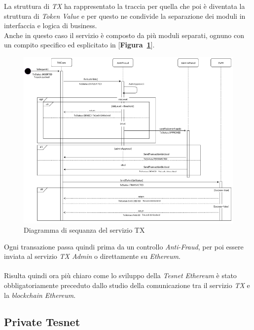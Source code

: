 \documentclass[11pt]{thesistemp}
\begin{document}
La struttura di \textit{TX} ha rappresentato la traccia per quella che poi è diventata la struttura di \textit{Token Value} e per questo ne condivide la separazione dei moduli in interfaccia e logica di business.\\
Anche in questo caso il servizio è composto da più moduli separati, ognuno con un compito specifico ed esplicitato in [\textbf{Figura~\ref{fig:tx-seq-diag}}].\\
\begin{figure}[h]
    \centering
    \includegraphics[scale=0.55]{tx-seq-diag.png}
        \caption{Diagramma di sequanza del servizio TX}
    \label{fig:tx-seq-diag}
\end{figure}
\linebreak
Ogni transazione passa quindi prima da un controllo \textit{Anti-Fraud}, per poi essere inviata al servizio \textit{TX Admin} o direttamente su \textit{Ethereum}.\\\\
Risulta quindi ora più chiaro come lo sviluppo della \textit{Tesnet Ethereum} è stato obbligatoriamente preceduto dallo studio della comunicazione tra il servizio \textit{TX} e la \textit{blockchain Ethereum}.

\pagebreak

\subsection{Private Tesnet}
\end{document}

